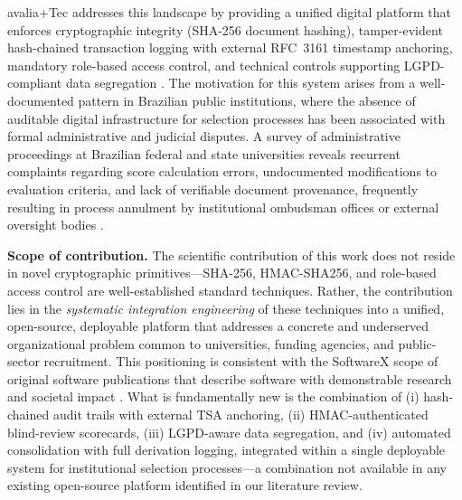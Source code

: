 \documentclass[preprint,12pt,a4paper]{elsarticle}
\begin{document}
\begin{table}[!h]
\caption{Functional comparison of avalia+Tec with existing platforms. Comparison criteria were defined based on regulatory requirements (LGPD/GDPR), security best practices (OWASP, NIST), and institutional governance needs, independently of the proposed system's feature set. Platform capabilities were assessed from official documentation, published source code, and peer-reviewed literature where available.}
\label{tab:comparison}
\end{table}

avalia+Tec addresses this landscape by providing a unified digital platform that enforces cryptographic integrity (SHA-256 document hashing), tamper-evident hash-chained transaction logging with external RFC~3161 timestamp anchoring, mandatory role-based access control, and technical controls supporting LGPD-compliant data segregation \citep{Piotrowski2007,Marques2022}. The motivation for this system arises from a well-documented pattern in Brazilian public institutions, where the absence of auditable digital infrastructure for selection processes has been associated with formal administrative and judicial disputes. A survey of administrative proceedings at Brazilian federal and state universities reveals recurrent complaints regarding score calculation errors, undocumented modifications to evaluation criteria, and lack of verifiable document provenance, frequently resulting in process annulment by institutional ombudsman offices or external oversight bodies \citep{Machado2018,Hood2007}.

\textbf{Scope of contribution.} The scientific contribution of this work does not reside in novel cryptographic primitives---SHA-256, HMAC-SHA256, and role-based access control are well-established standard techniques. Rather, the contribution lies in the \emph{systematic integration engineering} of these techniques into a unified, open-source, deployable platform that addresses a concrete and underserved organizational problem common to universities, funding agencies, and public-sector recruitment. This positioning is consistent with the SoftwareX scope of original software publications that describe software with demonstrable research and societal impact \citep{Sommerville2016}. What is fundamentally new is the combination of (i) hash-chained audit trails with external TSA anchoring, (ii) HMAC-authenticated blind-review scorecards, (iii) LGPD-aware data segregation, and (iv) automated consolidation with full derivation logging, integrated within a single deployable system for institutional selection processes---a combination not available in any existing open-source platform identified in our literature review.
\end{document}
